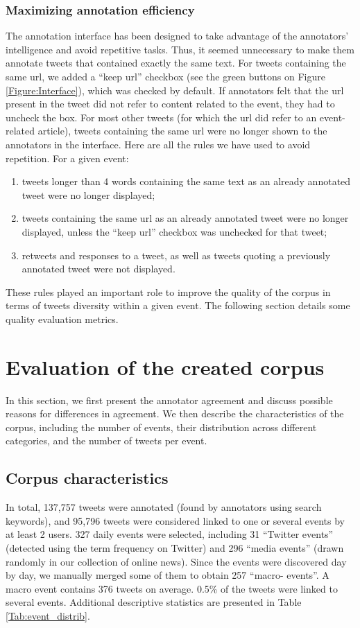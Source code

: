 \subsubsection{Maximizing annotation efficiency}
\label{annotation efficiency}
The annotation interface has been designed to take
advantage of the annotators’ intelligence and avoid
repetitive tasks. Thus, it seemed unnecessary to make
them annotate tweets that contained exactly the same text.
For tweets containing the same url, we added a “keep url”
checkbox (see the green buttons on Figure \ref{Figure:Interface}), which was
checked by default. If annotators felt that the url present in
the tweet did not refer to content related to the event, they
had to uncheck the box. For most other tweets (for which
the url did refer to an event-related article), tweets
containing the same url were no longer shown to the
annotators in the interface.
Here are all the rules we have used to avoid repetition. For
a given event:
\begin{enumerate}
    \item tweets longer than 4 words containing the same text as
an already annotated tweet were no longer displayed;
    \item tweets containing the same url as an already annotated
tweet were no longer displayed, unless the “keep url”
checkbox was unchecked for that tweet;
    \item retweets and responses to a tweet, as well as tweets
quoting a previously annotated tweet were not displayed.
\end{enumerate}
These rules played an important role to improve the
quality of the corpus in terms of tweets diversity within a
given event. The following section details some quality
evaluation metrics.

\section{Evaluation of the created corpus}
\label{Evaluation of the created corpus}

In this section, we first present the annotator agreement and discuss possible reasons for differences in agreement. We then describe  the characteristics of the corpus, including the number of events, their distribution across different categories, and the number of tweets per event. 


	\subsection{Corpus characteristics}
In total, 137,757 tweets were annotated (found by
annotators using search keywords), and 95,796 tweets
were considered linked to one or several events by at least 2 users. 327
daily events were selected, including 31 “Twitter events”
(detected using the term frequency on Twitter) and 296
“media events” (drawn randomly in our collection of
online news). Since the events were discovered day by day, we
manually merged some of them to obtain 257 “macro-
events”. A macro event contains 376 tweets on average. 0.5\%
of the tweets were linked to several events. Additional
descriptive statistics are presented in Table \ref{Tab:event_distrib}.

